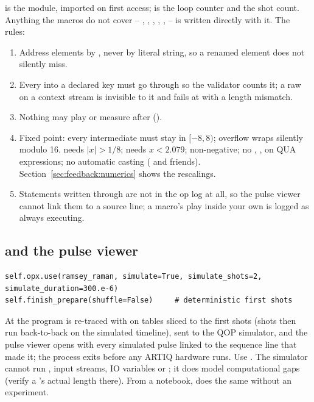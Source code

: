  is the  module, imported on first access;
 is the loop counter and  the shot count.
Anything the macros do not cover -- , ,
, , ,  -- is written directly
with it. The rules:

\begin{enumerate}[nosep]
  \item Address elements by , never by literal
    string, so a renamed element does not silently miss.
  \item Every  into a declared key must go through
     so the validator counts it; a raw  on a
    context stream is invisible to it and fails at 
    with a length mismatch.
  \item Nothing may play or measure after 
    ().
  \item Fixed point: every intermediate must stay in $[-8, 8)$; overflow
    wraps silently modulo 16.  needs $|x| > 1/8$;
     needs $x < 2.079$;  non-negative; no
    \code{**}, \code{//}, \code{\%} on QUA expressions; no automatic casting
    ( and friends). Section~\ref{sec:feedback:numerics}
    shows the rescalings.
  \item Statements written through  are not in the op log at
    all, so the pulse viewer cannot link them to a source line; a macro's
    play inside your own  is logged as always executing.
\end{enumerate}

\subsection{ and the pulse viewer}

\begin{lstlisting}[style=py]
self.opx.use(ramsey_raman, simulate=True, simulate_shots=2, simulate_duration=300.e-6)
self.finish_prepare(shuffle=False)     # deterministic first shots
\end{lstlisting}

At  the program is re-traced with
 on tables sliced to the first 
shots (shots then run back-to-back on the simulated timeline), sent to the
QOP simulator, and the pulse viewer opens with every simulated pulse linked
to the sequence line that made it; the process exits before any ARTIQ
hardware runs. Use . The simulator cannot run
, input streams, IO variables or ; it does
model computational gaps (verify a 's actual length there). From a
notebook,  does the same without an
experiment.

